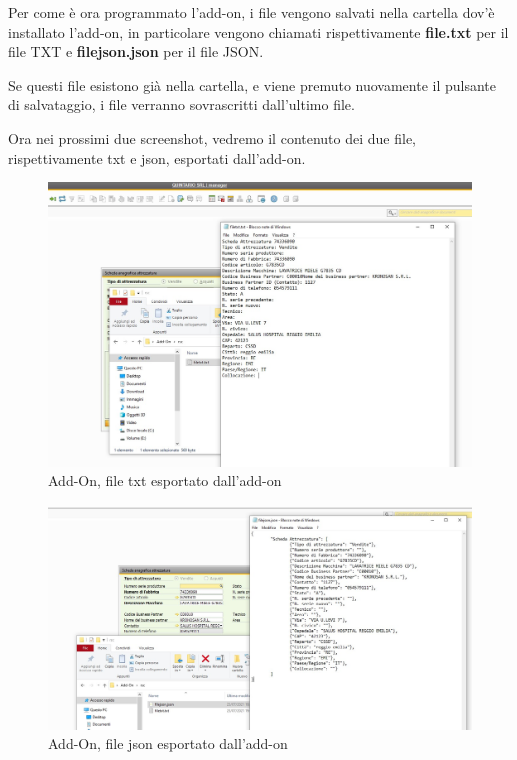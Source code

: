 \begin{flushleft}
	Per come è ora programmato l'add-on, i file vengono salvati nella cartella dov'è installato l'add-on, in particolare vengono chiamati rispettivamente \textbf{file.txt} per il file TXT e \textbf{filejson.json} per il file JSON.
	
	Se questi file esistono già nella cartella, e viene premuto nuovamente il pulsante di salvataggio, i file verranno sovrascritti dall'ultimo file.
	
\end{flushleft}

\newpage

\begin{flushleft}
	
	Ora nei prossimi due screenshot, vedremo il contenuto dei due file, rispettivamente txt e json, esportati dall'add-on.
	
\end{flushleft}
\begin{figure}[!h] 
	\centering 
	\includegraphics[scale = 0.38]{immagini/add-on/addon-esporta-txt.jpg} 
	\caption{Add-On, file txt esportato dall'add-on}
\end{figure}

\begin{figure}[!h] 
	\centering 
	\includegraphics[scale = 0.38]{immagini/add-on/addon-esporta-json.jpg} 
	\caption{Add-On, file json esportato dall'add-on}
\end{figure}

